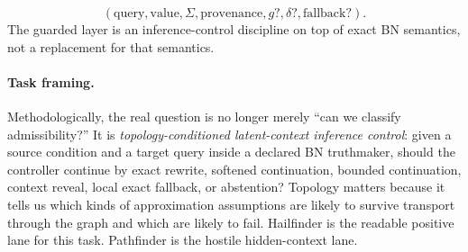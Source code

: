 \documentclass[11pt,openany]{report}
\begin{document}
\[
  (\text{query}, \text{value}, \Sigma, \text{provenance}, g?, \delta?,
    \text{fallback}?).
\]
The guarded layer is an inference-control discipline on top of exact BN
semantics, not a replacement for that semantics.

\begin{center}
\end{center}

\paragraph{Task framing.}
Methodologically, the real question is no longer merely ``can we
classify admissibility?''  It is \emph{topology-conditioned
latent-context inference control}: given a source condition and a target
query inside a declared BN truthmaker, should the controller continue by
exact rewrite, softened continuation, bounded continuation, context
reveal, local exact fallback, or abstention?  Topology matters because
it tells us which kinds of approximation assumptions are likely to
survive transport through the graph and which are likely to fail.
Hailfinder is the readable positive lane for this task.  Pathfinder is
the hostile hidden-context lane.
\end{document}
